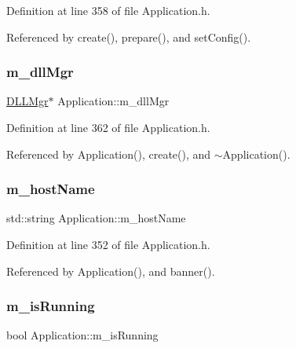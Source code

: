 Definition at line 358 of file Application.\+h.



Referenced by create(), prepare(), and set\+Config().

\mbox{\label{classApplication_a66b06cbeb824fe00ecd11499fcf01c55}} 
\subsubsection{\texorpdfstring{m\+\_\+dll\+Mgr}{m\_dllMgr}}
{\footnotesize\ttfamily \hyperlink{classDLLMgr}{D\+L\+L\+Mgr}$\ast$ Application\+::m\+\_\+dll\+Mgr\hspace{0.3cm}{\ttfamily [private]}}



Definition at line 362 of file Application.\+h.



Referenced by Application(), create(), and $\sim$\+Application().

\mbox{\label{classApplication_a20094c2bf311e2046942eeeec4a11f02}} 
\subsubsection{\texorpdfstring{m\+\_\+host\+Name}{m\_hostName}}
{\footnotesize\ttfamily std\+::string Application\+::m\+\_\+host\+Name\hspace{0.3cm}{\ttfamily [protected]}}



Definition at line 352 of file Application.\+h.



Referenced by Application(), and banner().

\mbox{\label{classApplication_ae316ea43e74cc0d536dcbb16b2fbb974}} 
\subsubsection{\texorpdfstring{m\+\_\+is\+Running}{m\_isRunning}}
{\footnotesize\ttfamily bool Application\+::m\+\_\+is\+Running\hspace{0.3cm}{\ttfamily [protected]}}



